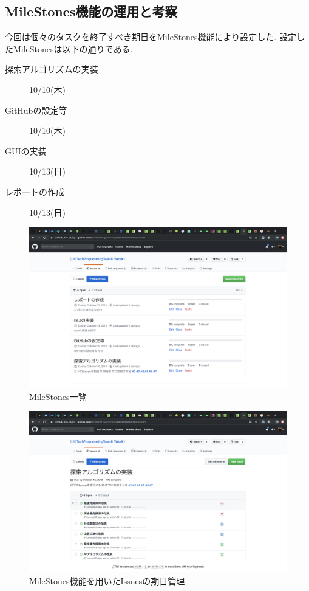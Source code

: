 \documentclass[uplatex,12pt]{jsarticle}
\begin{document}
\newpage


\subsection{MileStones機能の運用と考察}
今回は個々のタスクを終了すべき期日をMileStones機能により設定した.
設定したMileStonesは以下の通りである. \\
\begin{description}
  \item[探索アルゴリズムの実装] 10/10(木)
  \item[GitHubの設定等] 10/10(木)
  \item[GUIの実装] 10/13(日)
  \item[レポートの作成] 10/13(日)
\end{description}

\begin{figure}[!hbt]
  \centering
  \includegraphics[scale=0.20]{git_image/milestones_list_image.png}
  \caption{MileStones一覧}
\end{figure}

\begin{figure}[!hbt]
  \centering
  \includegraphics[scale=0.20]{git_image/milestones_image.png}
  \caption{MileStones機能を用いたIssuesの期日管理}
\end{figure}
\end{document}

